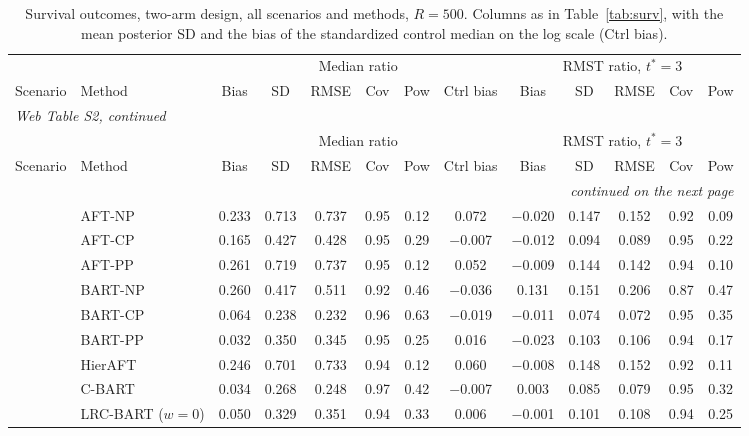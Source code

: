 \documentclass[11pt]{article}
\theoremstyle{definition}
\theoremstyle{plain}
\begin{document}
\begin{center}
\scriptsize
\setlength{\tabcolsep}{3pt}
\renewcommand{\arraystretch}{0.8}
\begin{longtable}{llccccccccccc}
\caption{Survival outcomes, two-arm design, all scenarios and methods, $R=500$. Columns as in Table~\ref{tab:surv}, with the mean posterior SD and the bias of the standardized control median on the log scale (Ctrl bias).}\label{tab:surv_full}\\
\toprule
& & \multicolumn{6}{c}{Median ratio} & \multicolumn{5}{c}{RMST ratio, $t^\ast=3$} \\
\cmidrule(lr){3-8}\cmidrule(lr){9-13}
Scenario & Method & Bias & SD & RMSE & Cov & Pow & Ctrl bias & Bias & SD & RMSE & Cov & Pow \\
\midrule
\endfirsthead
\multicolumn{13}{l}{\textit{Web Table S2, continued}}\\
\toprule
& & \multicolumn{6}{c}{Median ratio} & \multicolumn{5}{c}{RMST ratio, $t^\ast=3$} \\
\cmidrule(lr){3-8}\cmidrule(lr){9-13}
Scenario & Method & Bias & SD & RMSE & Cov & Pow & Ctrl bias & Bias & SD & RMSE & Cov & Pow \\
\midrule
\endhead
\midrule
\multicolumn{13}{r}{\textit{continued on the next page}}\\
\endfoot
\bottomrule
\endlastfoot
\multirow{15}{*}{Sc1} & AFT-NP & 0.233 & 0.713 & 0.737 & 0.95 & 0.12 & 0.072 & $-$0.020 & 0.147 & 0.152 & 0.92 & 0.09 \\
& AFT-CP & 0.165 & 0.427 & 0.428 & 0.95 & 0.29 & $-$0.007 & $-$0.012 & 0.094 & 0.089 & 0.95 & 0.22 \\
& AFT-PP & 0.261 & 0.719 & 0.737 & 0.95 & 0.12 & 0.052 & $-$0.009 & 0.144 & 0.142 & 0.94 & 0.10 \\
& BART-NP & 0.260 & 0.417 & 0.511 & 0.92 & 0.46 & $-$0.036 & 0.131 & 0.151 & 0.206 & 0.87 & 0.47 \\
& BART-CP & 0.064 & 0.238 & 0.232 & 0.96 & 0.63 & $-$0.019 & $-$0.011 & 0.074 & 0.072 & 0.95 & 0.35 \\
& BART-PP & 0.032 & 0.350 & 0.345 & 0.95 & 0.25 & 0.016 & $-$0.023 & 0.103 & 0.106 & 0.94 & 0.17 \\
& HierAFT & 0.246 & 0.701 & 0.733 & 0.94 & 0.12 & 0.060 & $-$0.008 & 0.148 & 0.152 & 0.92 & 0.11 \\
& C-BART & 0.034 & 0.268 & 0.248 & 0.97 & 0.42 & $-$0.007 & 0.003 & 0.085 & 0.079 & 0.95 & 0.32 \\
& LRC-BART ($w=0$) & 0.050 & 0.329 & 0.351 & 0.94 & 0.33 & 0.006 & $-$0.001 & 0.101 & 0.108 & 0.94 & 0.25 \\

\end{longtable}
\end{center}
\end{document}
